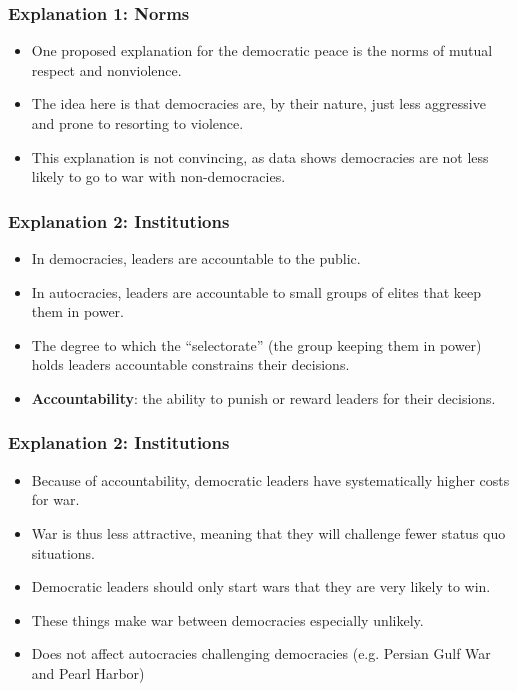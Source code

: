 \documentclass[handout]{beamer}
\begin{document}
\begin{frame} 
	\frametitle{\LARGE{Explanation 1: Norms}}
	\begin{itemize}
		\item One proposed explanation for the democratic peace is the norms of mutual respect and nonviolence. \pause 
		\item The idea here is that democracies are, by their nature, just less aggressive and prone to resorting to violence. \pause
		\item This explanation is not convincing, as data shows democracies are not less likely to go to war with non-democracies.
	\end{itemize}
\end{frame}

\begin{frame} 
\frametitle{\LARGE{Explanation 2: Institutions}}
\begin{itemize}
		\item In democracies, leaders are accountable to the public. \pause
		\item In autocracies, leaders are accountable to small groups of elites that keep them in power. \pause
		\item The degree to which the ``selectorate'' (the group keeping them in power) holds leaders accountable constrains their decisions. \pause
		\item \textbf{Accountability}: the ability to punish or reward leaders for their decisions.

\end{itemize}
\end{frame}


\begin{frame} 
\frametitle{\LARGE{Explanation 2: Institutions}}
\begin{itemize}
		\item Because of accountability, democratic leaders have systematically higher costs for war. \pause 
		\item War is thus less attractive, meaning that they will challenge fewer status quo situations. \pause
		\item Democratic leaders should only start wars that they are very likely to win. \pause 
		\item These things make war between democracies especially unlikely. \pause 
		\item Does not affect autocracies challenging democracies (e.g. Persian Gulf War and Pearl Harbor)
\end{itemize}
\end{frame}
\end{document}
